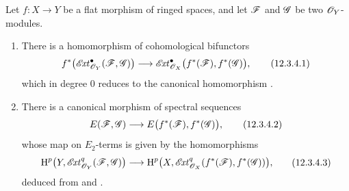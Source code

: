 \begin{proposition}[12.3.4]
\label{0.12.3.4}
Let $f:X\to Y$ be a flat morphism of ringed spaces, and let
$\mathscr{F}$ and $\mathscr{G}$ be two $\mathscr{O}_Y$-modules.
\begin{enumerate}
  \item[\rm(i)] There is a homomorphism of cohomological bifunctors
  \[
    f^*\bigl(\mathscr{E}\!\mathit{xt}^\bullet_{\mathscr{O}_Y}(\mathscr{F},\mathscr{G})\bigr)
    \longrightarrow
    \mathscr{E}\!\mathit{xt}^\bullet_{\mathscr{O}_X}
      \bigl(f^*(\mathscr{F}),f^*(\mathscr{G})\bigr),
    \tag{12.3.4.1}
    \label{0.12.3.4.1}
  \]
  which in degree $0$ reduces to the canonical homomorphism
  .

  \item[\rm(ii)] There is a canonical morphism of spectral sequences
  \[
    E(\mathscr{F},\mathscr{G})
    \longrightarrow E\bigl(f^*(\mathscr{F}),f^*(\mathscr{G})\bigr),
    \tag{12.3.4.2}
    \label{0.12.3.4.2}
  \]
  whose map on $E_2$-terms is given by the homomorphisms
  \[
    \begin{aligned}
    \mathrm{H}^p\bigl(Y,\mathscr{E}\!\mathit{xt}^q_{\mathscr{O}_Y}(\mathscr{F},\mathscr{G})\bigr)
    \longrightarrow
    \mathrm{H}^p\bigl(X,\mathscr{E}\!\mathit{xt}^q_{\mathscr{O}_X}
      (f^*(\mathscr{F}),f^*(\mathscr{G}))\bigr),
    \end{aligned}
    \tag{12.3.4.3}
    \label{0.12.3.4.3}
  \]
  deduced from  and .
\end{enumerate}
\end{proposition}

